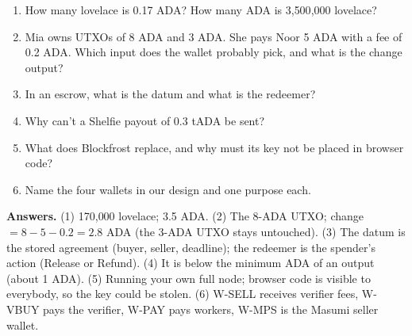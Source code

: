 \begin{quizbox}
\begin{enumerate}
  \item How many lovelace is 0.17 ADA? How many ADA is 3{,}500{,}000 lovelace?
  \item Mia owns UTXOs of 8 ADA and 3 ADA. She pays Noor 5 ADA with a fee of 0.2 ADA. Which input does the wallet probably pick, and what is the change output?
  \item In an escrow, what is the datum and what is the redeemer?
  \item Why can't a Shelfie payout of 0.3 tADA be sent?
  \item What does Blockfrost replace, and why must its key not be placed in browser code?
  \item Name the four wallets in our design and one purpose each.
\end{enumerate}
{\footnotesize\color{cGrey}\textbf{Answers.} (1) 170{,}000 lovelace; 3.5 ADA. (2) The 8-ADA UTXO; change $=8-5-0.2=2.8$ ADA (the 3-ADA UTXO stays untouched). (3) The datum is the stored agreement (buyer, seller, deadline); the redeemer is the spender's action (Release or Refund). (4) It is below the minimum ADA of an output (about 1 ADA). (5) Running your own full node; browser code is visible to everybody, so the key could be stolen. (6) W-SELL receives verifier fees, W-VBUY pays the verifier, W-PAY pays workers, W-MPS is the Masumi seller wallet.}
\end{quizbox}
